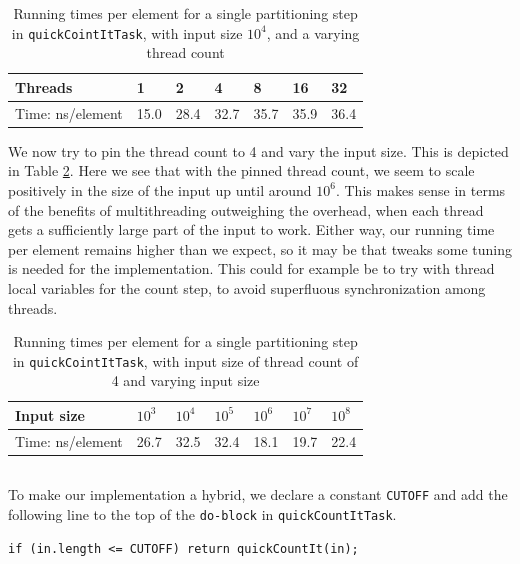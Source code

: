 \documentclass[a5paper]{article}
\begin{document}
\begin{table}[ht!]
\centering
\begin{tabular}{|l|l|l|l|l|l|l|}
\hline
Threads          & 1    & 2    & 4    & 8    & 16   & 32   \\ \hline
Time: ns/element & 15.0 & 28.4 & 32.7 & 35.7 & 35.9 & 36.4 \\ \hline
\end{tabular}
\caption{Running times per element for a single partitioning step in \texttt{quickCointItTask}, with input size $10^4$, and a varying thread count}
\label{table:constn}
\end{table}

We now try to pin the thread count to 4 and vary the input size. This is depicted in Table \ref{table:constt}. Here we see that with the pinned thread count, we seem to scale positively in the size of the input up until around $10^6$. This makes sense in terms of the benefits of multithreading outweighing the overhead, when each thread gets a sufficiently large part of the input to work. Either way, our running time per element remains higher than we expect, so it may be that tweaks some tuning is needed for the implementation. This could for example be to try with thread local variables for the count step, to avoid superfluous synchronization among threads.

\begin{table}[ht!]
\centering
\begin{tabular}{|l|l|l|l|l|l|l|}
\hline
Input size       & $10^3$ & $10^4$ & $10^5$ & $10^6$ & $10^7$ & $10^8$ \\ \hline
Time: ns/element & 26.7 & 32.5  & 32.4   & 18.1    & 19.7     & 22.4      \\ \hline
\end{tabular}
\caption{Running times per element for a single partitioning step in \texttt{quickCointItTask}, with input size of thread count of 4 and varying input size}
\label{table:constt}
\end{table}

\subsection{}
To make our implementation a hybrid, we declare a constant \texttt{CUTOFF} and add the following line to the top of the \texttt{do-block} in \texttt{quickCountItTask}.
\begin{lstlisting}
if (in.length <= CUTOFF) return quickCountIt(in);
\end{lstlisting}
\end{document}
